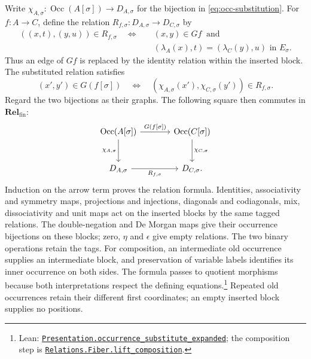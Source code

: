 \documentclass[11pt]{article}
\newcommand{\Occ}{\operatorname{Occ}}
\newcommand{\Rel}{\mathbf{Rel}_{\mathrm{fin}}}
\begin{document}
Write $\chi_{A,\sigma}:\Occ(A[\sigma])\to D_{A,\sigma}$ for
the bijection in \eqref{eq:occ-substitution}. For $f:A\to C$,
define the relation
$R_{f,\sigma}:D_{A,\sigma}\to D_{C,\sigma}$ by
\[
 \begin{aligned}
 ((x,t),(y,u))\in R_{f,\sigma}
 \quad\Longleftrightarrow\quad&
 (x,y)\in Gf\ \text{ and}\\
 &(\lambda_A(x),t)=(\lambda_C(y),u)\text{ in }E_\sigma.
 \end{aligned}
\]
Thus an edge of $Gf$ is replaced by the identity relation within
the inserted block. The substituted relation satisfies
\[
 (x',y')\in G(f[\sigma])
 \quad\Longleftrightarrow\quad
 (\chi_{A,\sigma}(x'),\chi_{C,\sigma}(y'))\in R_{f,\sigma}.
\]
Regard the two bijections as their graphs. The following square
then commutes in $\Rel$:
\[
\begin{tikzcd}[column sep=large,row sep=large]
 \Occ(A[\sigma])\arrow[r,"{G(f[\sigma])}"]
    \arrow[d,"{\chi_{A,\sigma}}"']
   &\Occ(C[\sigma])\arrow[d,"{\chi_{C,\sigma}}"]\\
 D_{A,\sigma}\arrow[r,"{R_{f,\sigma}}"']&D_{C,\sigma}.
\end{tikzcd}
\]
Induction on the arrow term proves the relation formula.
Identities, associativity and symmetry maps, projections and
injections, diagonals and codiagonals, mix, dissociativity and
unit maps act on the inserted blocks by the same tagged relations.
The double-negation and De Morgan maps give their occurrence
bijections on these blocks; zero, $\eta$ and $\epsilon$ give
empty relations. The two binary
operations retain the tags. For composition, an intermediate old
occurrence supplies an intermediate block, and preservation of
variable labels identifies its inner occurrence on both sides.
The formula passes to quotient morphisms because both interpretations
respect the defining equations.\footnote{\raggedright Lean:
\href{https://github.com/flengyel/Dosen-Petric-Maximality/blob/dosen-petric-v25-palomar-v3/DosenPetric/PresentationSubstitutionRelation.lean\#L61}{\texttt{Presentation.\allowbreak{}occurrence\_substitute\_expanded}};
the composition step is
\href{https://github.com/flengyel/Dosen-Petric-Maximality/blob/dosen-petric-v25-palomar-v3/DosenPetric/SubstitutionFiberRelations.lean\#L48}{\texttt{Relations.Fiber.\allowbreak{}lift\_composition}}.}
Repeated old occurrences retain their different first coordinates;
an empty inserted block supplies no positions.
\end{document}
